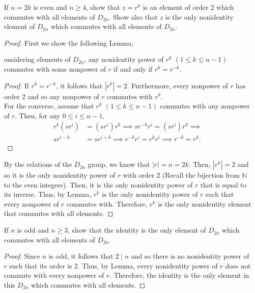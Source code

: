 \documentclass[12pt]{article}
\newcommand{\N}{\mathbb{N}}
\newenvironment{lemma}[2][Lemma]{\begin{trivlist} \item[\hskip \labelsep {\bfseries #1}\hskip \labelsep {\bfseries #2.}]}{\end{trivlist}}
\newenvironment{problem}[2][Problem]{\begin{trivlist} \item[\hskip \labelsep {\bfseries #1}\hskip \labelsep {\bfseries #2.}]}{\end{trivlist}}
\begin{document}
\begin{problem}{4}
  If $n=2k$ is even and $n\geq 4$, show that $z=r^{k}$ is an element of order 2 which commutes with all elements of $D_{2n}$. Show also that $z$ is the only nonidentity element of $D_{2n}$ which commutes with all elements of $D_{2n}$. 
\begin{proof}
  First we show the following Lemma, 
\begin{lemma}
  Considering elements of $D_{2n}$, any nonidentity power of $r^{k}$ $(1\leq k \leq n-1)$ commutes with some nonpower of $r$ if and only if $r^{k}= r^{-k}$.
\begin{proof}
  If $r^{k} = r^{-k}$, it follows that $|r^{k}|=2$. Furthermore, every nonpower of $r$ has order 2 and so any nonpower of $r$ commutes with $r^{k}$.\\
  For the converse, assume that $r^{k}$ $(1\leq k \leq n-1)$ commutes with any nonpower of $r$. Then, for any $0\leq i\leq n-1$,
\begin{align*}
  r^{k}(sr^{i}) &= (sr^{i})r^{k} \implies sr^{-k}r^{i} = (sr^{i})r^{k} \implies\\
  sr^{i-k} &= sr^{i+k} \implies r^{-k}r^{i} = r^{k}r^{i} \implies r^{-k} = r^{k}.
\end{align*}
\end{proof}
\end{lemma}
By the relations of the $D_{2n}$ group, we know that $|r|=n=2k$. Then, $|r^{k}|=2$ and so it is the only nonidentity power of $r$ with order 2 (Recall the bijection from $\N$ to the even integers). Then, it is the only nonidentity power of $r$ that is equal to its inverse.  Thus, by Lemma, $r^{k}$ is the only nonidentity power of $r$ such that every nonpower of $r$ commutes with. Therefore, $r^{k}$ is the only nonidentity element that commutes with all elements.   
\end{proof}
\end{problem}
\begin{problem}{5}
  If $n$ is odd and $n\geq 3$, show that the identity is the only element of $D_{2n}$ which commutes with all elements of $D_{2n}$.
\begin{proof}
  Since $n$ is odd, it follows that $2\mid n$ and so there is no nonidentity power of $r$ such that its order is 2. Thus, by Lemma, every nonidentity power of $r$ does not commute with every nonpower of $r$. Therefore, the identity is the only element in this $D_{2n}$ which commutes with all elements.
\end{proof}
\end{problem}
\end{document}
